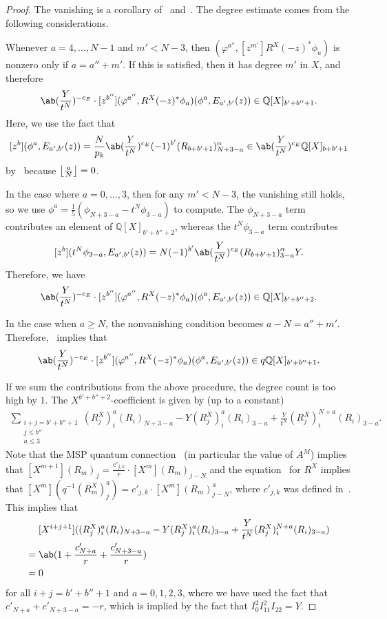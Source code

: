 \documentclass[10pt]{amsart}
\DeclarePairedDelimiter{\floor}{\lfloor}{\rfloor}
\theoremstyle{definition}
\theoremstyle{remark}
\theoremstyle{plain}
\theoremstyle{definition}
\theoremstyle{remark}
\newcommand{\Q}{\mathbb{Q}}
\newcommand{\1}{\mathbf{1}}
\newcommand{\2}{\mathbf{2}}
\newcommand{\3}{\mathbf{3}}
\numberwithin{equation}{section}
\begin{document}
\begin{proof}
    The vanishing is a corollary of~ and~. The degree estimate comes from the following considerations.

    Whenever $a = 4, \ldots, N-1$ and $m' < N-3$, then $(\varphi^{a''}, [z^{m'}] R^X(-z)^* \phi_a)$ is nonzero only if $a = a''+m'$. If this is satisfied, then it has degree $m'$ in $X$, and therefore
    \[ \ab(\frac{Y}{t^N})^{-c_E} \cdot [z^{b''}] (\varphi^{a''}, R^X(-z)^* \phi_a)(\phi^a, E_{a',b'}(z)) \in \Q[X]_{b'+b''+1}. \]
    Here, we use the fact that 
    \[ [z^b](\phi^a, E_{a',b'}(z)) = \frac{N}{p_k} \ab(\frac{Y}{t^N})^{c_E} (-1)^{b'} (R_{b+b'+1})_{N+3-a}^{\alpha} \in \ab(\frac{Y}{t^N})^{c_E} \Q[X]_{b+b'+1} \] by~ because $\floor*{\frac{a}{N}} = 0$.

    In the case where $a = 0,\ldots,3$, then for any $m' < N-3$, the vanishing still holds, so we use $\phi^a = \frac{1}{5}(\phi_{N+3-a} - t^N \phi_{3-a})$ to compute. The $\phi_{N+3-a}$ term contributes an element of $\Q[X]_{b'+b''+2}$, whereas the $t^N \phi_{3-a}$ term contributes
    \[ [z^b](t^N \phi_{3-a}, E_{a',b'}(z)) = N (-1)^{b'} \ab(\frac{Y}{t^N})^{c_E} (R_{b+b'+1})_{3-a}^{\alpha} Y. \]
    Therefore, we have
    \[ \ab(\frac{Y}{t^N})^{-c_E} \cdot [z^{b''}] (\varphi^{a''}, R^X(-z)^* \phi_a)(\phi^a, E_{a',b'}(z)) \in \Q[X]_{b'+b''+2}. \]

    In the case when $a \geq N$, the nonvanishing condition becomes $a-N = a''+m'$. Therefore,~ implies that
    \[ \ab(\frac{Y}{t^N})^{-c_E} \cdot [z^{b''}] (\varphi^{a''}, R^X(-z)^* \phi_a)(\phi^a, E_{a',b'}(z)) \in q\Q[X]_{b'+b''+1}. \]

    If we sum the contributions from the above procedure, the degree count is too high by $1$. The $X^{b'+b''+2}$-coefficient is given by (up to a constant)
    \begin{align*}
        [X^{b'+b''+2}] \sum_{\substack{i+j=b'+b''+1 \\ j \leq b'' \\ a \leq 3}} (R^X_j)_i^a (R_i)_{N+3-a} - Y (R_j^X)_i^a(R_i)_{3-a} + \frac{Y}{t^N} (R_j^X)_{i}^{N+a} (R_i)_{3-a}.
    \end{align*}
    Note that the MSP quantum connection~ (in particular the value of $A^M$) implies that $[X^{m+1}] (R_m)_j = \frac{c'_{j,k}}{r} \cdot [X^m] (R_m)_{j-N}$ and the equation~ for $R^X$ implies that $[X^m] (q^{-1} (R^X_m)_j^a) = c'_{j,k} \cdot [X^m] (R_m)_{j-N}^a$, where $c'_{j,k}$ was defined in~. This implies that
    \begin{align*}
        & [X^{i+j+1}] ( (R_j^X)_i^a (R_i)_{N+3-a} - Y(R_j^X)_i^a (R_i)_{3-a} + \frac{Y}{t^N} (R_j^X)_i^{N+a}(R_i)_{3-a}) \\
        ={}& \ab(1+\frac{c'_{N+a}}{r} + \frac{c'_{N+3-a}}{r}) \\
        ={}& 0
    \end{align*}
    for all $i+j = b'+b''+1$ and $a = 0,1,2,3$, where we have used the fact that $c'_{N+a} + c'_{N+3-a} = -r$, which is implied by the fact that $I_0^2 I_{11}^2 I_{22} = Y$.
\end{proof}
\end{document}
